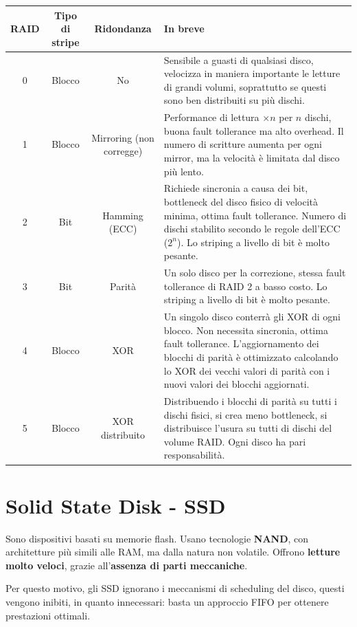 \documentclass{report}
\begin{document}
\begin{table}[htp]
    \centering
    \begin{tabular}{|c|c|c|p{7cm}|}
    \hline
        RAID & Tipo di stripe & Ridondanza & In breve \\
    \hline
        0 & Blocco & No & Sensibile a guasti di qualsiasi disco, velocizza in maniera importante le letture di grandi volumi, soprattutto se questi sono ben distribuiti su più dischi.\\
        \hline
        1 & Blocco & Mirroring (non corregge) & Performance di lettura $\times n$ per $n$ dischi, buona fault tollerance ma alto overhead. Il numero di scritture aumenta per ogni mirror, ma la velocità è limitata dal disco più lento.\\
        \hline
        2 & Bit & Hamming (ECC) & Richiede sincronia a causa dei bit, bottleneck del disco fisico di velocità minima, ottima fault tollerance. Numero di dischi stabilito secondo le regole dell'ECC ($2^n$). Lo striping a livello di bit è molto pesante.\\
        \hline
        3 & Bit & Parità & Un solo disco per la correzione, stessa fault tollerance di RAID 2 a basso costo. Lo striping a livello di bit è molto pesante.\\
        \hline
        4 & Blocco & XOR &  Un singolo disco conterrà gli XOR di ogni blocco. Non necessita sincronia, ottima fault tollerance. L'aggiornamento dei blocchi di parità è ottimizzato calcolando lo XOR dei vecchi valori di parità con i nuovi valori dei blocchi aggiornati.\\
        \hline
        5 & Blocco & XOR distribuito &  Distribuendo i blocchi di parità su tutti i dischi fisici, si crea meno bottleneck, si distribuisce l'usura su tutti di dischi del volume RAID. Ogni disco ha pari responsabilità.\\
    \hline
    \end{tabular}
\end{table}

\newpage


\section{Solid State Disk - SSD}
Sono dispositivi basati su memorie flash. Usano tecnologie \textbf{NAND}, con architetture più simili alle RAM, ma dalla natura non volatile. Offrono \textbf{letture molto veloci}, grazie all'\textbf{assenza di parti meccaniche}.

Per questo motivo, gli SSD ignorano i meccanismi di scheduling del disco, questi vengono inibiti, in quanto innecessari: basta un approccio FIFO per ottenere prestazioni ottimali.
\end{document}
